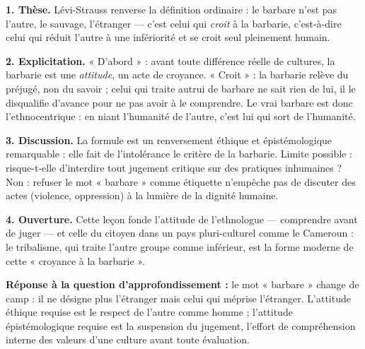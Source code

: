 \documentclass[11pt]{article}
\begin{document}
\begin{corrige}
\textbf{1. Thèse.} Lévi-Strauss renverse la définition ordinaire : le barbare n'est pas l'autre, le sauvage, l'étranger — c'est celui qui \emph{croit} à la barbarie, c'est-à-dire celui qui réduit l'autre à une infériorité et se croit seul pleinement humain.

\textbf{2. Explicitation.} « D'abord » : avant toute différence réelle de cultures, la barbarie est une \emph{attitude}, un acte de croyance. « Croit » : la barbarie relève du préjugé, non du savoir ; celui qui traite autrui de barbare ne sait rien de lui, il le disqualifie d'avance pour ne pas avoir à le comprendre. Le vrai barbare est donc l'ethnocentrique : en niant l'humanité de l'autre, c'est lui qui sort de l'humanité.

\textbf{3. Discussion.} La formule est un renversement éthique et épistémologique remarquable : elle fait de l'intolérance le critère de la barbarie. Limite possible : risque-t-elle d'interdire tout jugement critique sur des pratiques inhumaines ? Non : refuser le mot « barbare » comme étiquette n'empêche pas de discuter des actes (violence, oppression) à la lumière de la dignité humaine.

\textbf{4. Ouverture.} Cette leçon fonde l'attitude de l'ethnologue — comprendre avant de juger — et celle du citoyen dans un pays pluri-culturel comme le Cameroun : le tribalisme, qui traite l'autre groupe comme inférieur, est la forme moderne de cette « croyance à la barbarie ».

\textbf{Réponse à la question d'approfondissement :} le mot « barbare » change de camp : il ne désigne plus l'étranger mais celui qui méprise l'étranger. L'attitude éthique requise est le respect de l'autre comme homme ; l'attitude épistémologique requise est la suspension du jugement, l'effort de compréhension interne des valeurs d'une culture avant toute évaluation.
\end{corrige}
\end{document}
